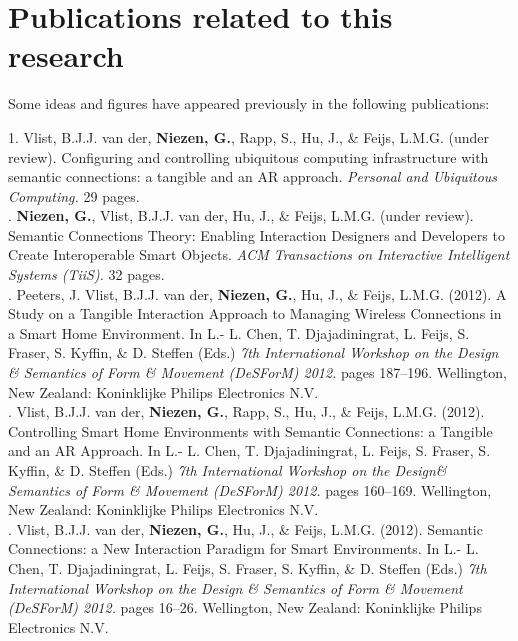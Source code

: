\pagestyle{empty}

\chapter*{Publications related to this research}

Some ideas and figures have appeared previously in the following publications:

\bigskip

1. Vlist, B.J.J. van der, \textbf{Niezen, G.}, Rapp, S., Hu, J., \& Feijs, L.M.G.  (under review). Configuring and controlling ubiquitous computing infrastructure with semantic connections: a tangible and an AR approach. \emph{Personal and Ubiquitous Computing.} 29 pages. \\

. \textbf{Niezen, G.}, Vlist, B.J.J. van der, Hu, J., \& Feijs, L.M.G.  (under review). Semantic Connections Theory: Enabling Interaction Designers and Developers to Create Interoperable Smart Objects. \emph{ACM Transactions on Interactive Intelligent Systems (TiiS).} 32 pages. \\

. Peeters, J. Vlist, B.J.J. van der, \textbf{Niezen, G.}, Hu, J., \& Feijs, L.M.G. (2012). A Study on a Tangible Interaction Approach to Managing Wireless Connections in a Smart Home Environment.  In L.- L. Chen, T. Djajadiningrat, L. Feijs, S. Fraser, S. Kyffin, \&  D. Steffen (Eds.) \emph{7th International Workshop on the Design \& Semantics of Form \& Movement (DeSForM) 2012.} pages 187--196. Wellington, New Zealand: Koninklijke Philips Electronics N.V.\\

. Vlist, B.J.J. van der, \textbf{Niezen, G.}, Rapp, S., Hu, J., \& Feijs, L.M.G. (2012). Controlling Smart Home Environments with Semantic Connections: a Tangible and an AR Approach. In L.- L. Chen, T. Djajadiningrat, L. Feijs, S. Fraser, S. Kyffin, \&  D. Steffen (Eds.) \emph{7th International Workshop on the Design\& Semantics of Form \& Movement (DeSForM) 2012.} pages 160--169.  Wellington, New Zealand: Koninklijke Philips Electronics N.V.\\

. Vlist, B.J.J. van der, \textbf{Niezen, G.}, Hu, J., \& Feijs, L.M.G. (2012). Semantic Connections: a New Interaction Paradigm for Smart Environments. In L.- L. Chen, T. Djajadiningrat, L. Feijs, S. Fraser, S. Kyffin, \&  D. Steffen (Eds.) \emph{7th International Workshop on the Design \& Semantics of Form \& Movement (DeSForM) 2012.} pages 16--26. Wellington, New Zealand: Koninklijke Philips Electronics N.V.\\

